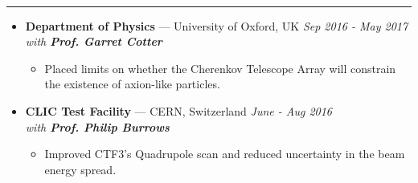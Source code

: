 \documentclass[11 pt,oneside]{article}
\newenvironment{ressection}[1]{
	\vspace{4pt}
	{\selectfont\Large\color{Mycolor2}{\textbf{#1}}}
	\vspace{-6.5pt} \\
	\textcolor{Mycolor2}{\rule{\textwidth}{0.7pt}}
	\begin{itemize}
	\vspace{3pt}
}{
	\end{itemize}
}
\newcommand{\ressubitem}{
	\vspace{-4pt}
	\item
}
\newcommand{\resbigitem}[3]{
	\vspace{-5pt}
	\item[]
	\textbf{#1} --- #2 %
	\hfill
	\textit{#3}
}
\newenvironment{ressubsec}[3]{
	\resbigitem{#1}{#2}{#3}
	\vspace{-2pt}
	\begin{itemize}
}{
	\end{itemize}
}
\begin{document}
\begin{ressection}{\textbf{Research}}
	\vspace{2pt}
	\begin{ressubsec}{Department of Physics}{University of Oxford, UK}{Sep 2016 - May 2017 \\ with \textbf{Prof. Garret Cotter}}
		\ressubitem{Placed limits on whether the Cherenkov Telescope Array will constrain the existence of axion-like particles.}
	\end{ressubsec}

	\vspace{2pt}

	\begin{ressubsec}{CLIC Test Facility}{CERN, Switzerland}{June - Aug 2016 \\ with \textbf{Prof. Philip Burrows}}
\ressubitem{Improved CTF3's Quadrupole scan and reduced uncertainty in the beam energy spread.}
	\end{ressubsec}



\end{ressection}

\end{document}
